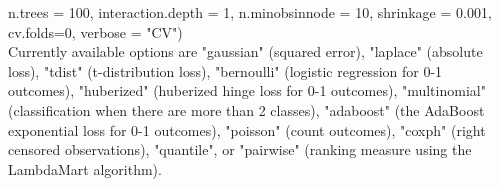 \documentclass[12pt, plandscape]{article}
\begin{document}
\begin{multicols}{3}
         n.trees = 100,
         interaction.depth = 1,
         n.minobsinnode = 10,
         shrinkage = 0.001,
         cv.folds=0,
         verbose = "CV")\\    
Currently available options are "gaussian" (squared error),
          "laplace" (absolute loss), "tdist" (t-distribution loss),
          "bernoulli" (logistic regression for 0-1 outcomes),
          "huberized" (huberized hinge loss for 0-1 outcomes),
          "multinomial" (classification when there are more than 2
          classes), "adaboost" (the AdaBoost exponential loss for 0-1
          outcomes), "poisson" (count outcomes), "coxph" (right
          censored observations), "quantile", or "pairwise" (ranking
          measure using the LambdaMart algorithm).



          

     








\end{multicols}
\end{document}
